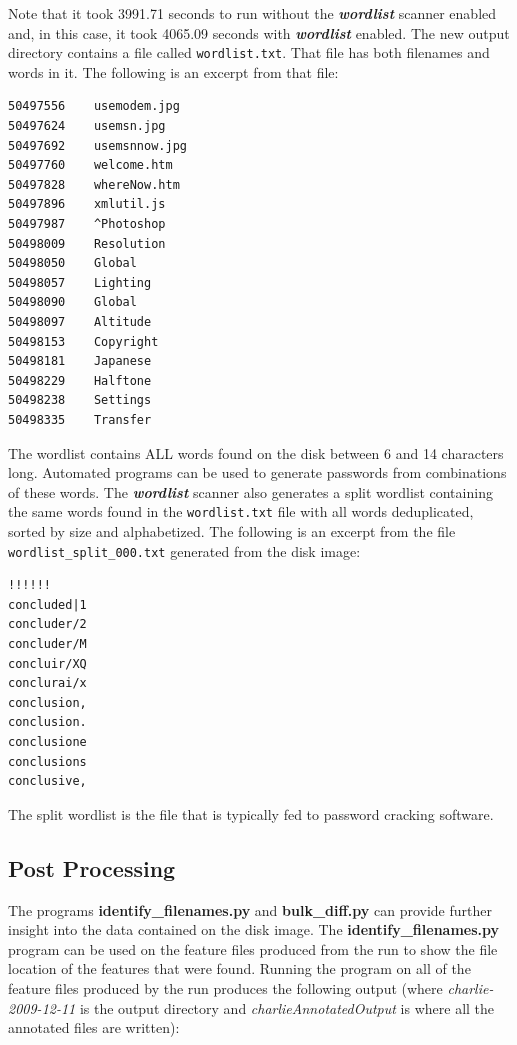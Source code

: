 Note that it took 3991.71 seconds to run \bulk without the \textbf{\textit{wordlist}} scanner enabled and, in this case, it took 4065.09 seconds with \textbf{\textit{wordlist}} enabled.  The new output directory contains a file called \texttt{wordlist.txt}. That file has both filenames and words in it. The following is an excerpt from that file:
\lstset{style=customfile}
\begin{lstlisting}
50497556	usemodem.jpg
50497624	usemsn.jpg
50497692	usemsnnow.jpg
50497760	welcome.htm
50497828	whereNow.htm
50497896	xmlutil.js
50497987	^Photoshop
50498009	Resolution
50498050	Global
50498057	Lighting
50498090	Global
50498097	Altitude
50498153	Copyright
50498181	Japanese
50498229	Halftone
50498238	Settings
50498335	Transfer
\end{lstlisting}
The wordlist contains ALL words found on the disk between 6 and 14 characters long. Automated programs can be used to generate passwords from combinations of these words. The \textbf{\textit{wordlist}} scanner also generates a split wordlist containing the same words found in the \texttt{wordlist.txt} file with all words deduplicated, sorted by size and alphabetized. The following is an excerpt from the file \texttt{wordlist\_split\_000.txt} generated from the disk image:
\lstset{style=customfile}
\begin{lstlisting}
!!!!!!
concluded|1
concluder/2
concluder/M
concluir/XQ
conclurai/x
conclusion,
conclusion.
conclusione
conclusions
conclusive,
\end{lstlisting}
The split wordlist is the file that is typically fed to password cracking software.

\subsection{Post Processing}
The programs \textbf{identify\_filenames.py} and \textbf{bulk\_diff.py} can provide further insight into the data contained on the disk image. The \textbf{identify\_filenames.py} program can be used on the feature files produced from the \bulk run to show the file location of the features that were found. Running the program on all of the feature files produced by the \bulk run produces the following output (where \textit{charlie-2009-12-11} is the \bulk output directory and \textit{charlieAnnotatedOutput} is where all the annotated files are written):\\

